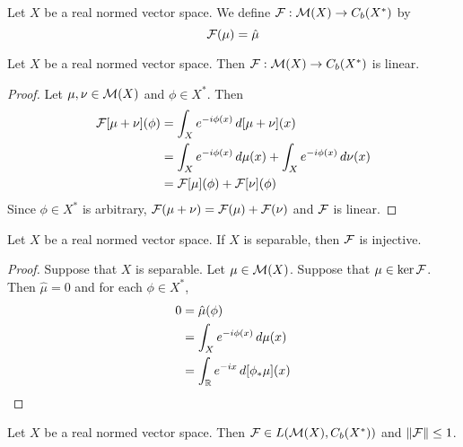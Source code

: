 \documentclass{book}
\begin{document}
	\begin{defn}
		Let $X$ be a real normed vector space. We define $\mathcal{F}: \mathcal{M}(X) \rightarrow C_b(X^*)$ by $$\mathcal{F}(\mu) = \hat{\mu}$$
	\end{defn}
	
	\begin{ex}
		Let $X$ be a real normed vector space. Then $\mathcal{F}: \mathcal{M}(X) \rightarrow C_b(X^*)$ is linear.
	\end{ex}
	
	\begin{proof}
		Let $\mu, \nu \in \mathcal{M}(X)$ and $\phi \in X^*$. Then 
		\begin{align*}
			\mathcal{F}[\mu + \nu](\phi) 
			& = \int_X e^{-i \phi(x)} \, d[\mu + \nu](x) \\
			& = \int_X e^{-i \phi(x)} \, d \mu(x) + \int_X e^{-i \phi(x)} \, d \nu(x) \\
			& = \mathcal{F}[\mu](\phi) + \mathcal{F}[\nu](\phi) 
		\end{align*}
		Since $\phi \in X^*$ is arbitrary, $\mathcal{F}(\mu + \nu) = \mathcal{F}(\mu) + \mathcal{F}(\nu)$ and $\mathcal{F}$ is linear.
	\end{proof}
	
	\begin{ex}
		Let $X$ be a real normed vector space. If $X$ is separable, then $\mathcal{F}$ is injective.  
	\end{ex}
	
	\begin{proof}
		Suppose that $X$ is separable. Let $\mu \in \mathcal{M}(X)$. Suppose that $\mu \in \ker \mathcal{F}$. Then $\hat{\mu} =0$ and for each $\phi \in X^*$, 
		\begin{align*}
			0 
			& = \hat{\mu}(\phi) \\
			& = \int_X e^{-i \phi(x)} \, d \mu(x) \\
			& = \int_{\mathbb{R}} e^{-ix} \, d[\phi_*\mu](x)
		\end{align*}
	\end{proof}
	
	\begin{ex}
		Let $X$ be a real normed vector space. Then $\mathcal{F} \in L(\mathcal{M}(X), C_b(X^*))$ and $\|\mathcal{F}\| \leq 1$.
	\end{ex}
	
\end{document}
